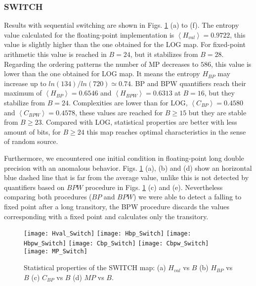 \subsubsection{SWITCH} \label{sssec:switch}

Results with sequential switching are shown in Figs. \ref{fig:SWITCH_QuantiB} (a) to (f).
The entropy value calculated for the floating-point implementation is $\left\langle H_{val}\right\rangle =0.9722$, this value is slightly higher than the one obtained for the LOG map. 
For fixed-point arithmetic this value is reached in $B=24$, but it stabilizes from $B=28$.
Regarding the ordering patterns the number of MP decreases to $586$, this value is lower than the one obtained for LOG map.
It means the entropy $H_{BP}$ may increase up to $ln(134)/ln(720)\simeq 0.74$.
BP and BPW quantifiers reach their maximum of $\left\langle H_{BP}\right\rangle =0.6546$ and $\left\langle H_{BPW}\right\rangle =0.6313$ at $B=16$, but they stabilize from $B=24$.
Complexities are lower than for LOG, $\left\langle C_{BP}\right\rangle =0.4580$ and $\left\langle C_{BPW}\right\rangle =0.4578$, these values are reached for $B \geq 15$ but they are stable from $B \geq 23$.
Compared with LOG, statistical properties are better with less amount of bits, for $B \geq 24$ this map reaches optimal characteristics in the sense of random source.

Furthermore, we encountered one initial condition in floating-point long double precision with an anomalous behavior.
Figs. \ref{fig:SWITCH_QuantiB} (a), (b) and (d) show an horizontal blue dashed line that is far from the average value, unlike this is not detected by quantifiers based on $BPW$ procedure in Figs. \ref{fig:SWITCH_QuantiB} (c) and (e).
Nevertheless comparing both procedures ($BP$ and $BPW$) we were able to detect a falling to fixed point after a long transitory, the BPW procedure discards the values corresponding with a fixed point and calculates only the transitory.

\begin{figure}
	\texttt{[image: Hval\_Switch]}
	\texttt{[image: Hbp\_Switch]}
	\texttt{[image: Hbpw\_Switch]}
	\texttt{[image: Cbp\_Switch]}
	\texttt{[image: Cbpw\_Switch]}
	\texttt{[image: MP\_Switch]}
	\caption{Statistical properties of the SWITCH map: (a) $H_{val}$ vs $B$ (b) $H_{BP}$ vs $B$ (c) $C_{BP}$ vs $B$ (d) $MP$ vs $B$.}
	\label{fig:SWITCH_QuantiB}
\end{figure}

